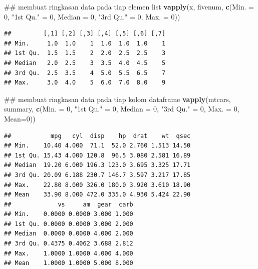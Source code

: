 \documentclass[]{book}
\newenvironment{Shaded}{\begin{snugshade}}{\end{snugshade}}
\newcommand{\KeywordTok}[1]{\textcolor[rgb]{0.13,0.29,0.53}{\textbf{#1}}}
\newcommand{\DataTypeTok}[1]{\textcolor[rgb]{0.13,0.29,0.53}{#1}}
\newcommand{\DecValTok}[1]{\textcolor[rgb]{0.00,0.00,0.81}{#1}}
\newcommand{\StringTok}[1]{\textcolor[rgb]{0.31,0.60,0.02}{#1}}
\newcommand{\NormalTok}[1]{#1}
\begin{document}
\begin{Shaded}
\begin{Highlighting}[]
\NormalTok{## membuat ringkasan data pada tiap elemen list}
\KeywordTok{vapply}\NormalTok{(x, fivenum,}
       \KeywordTok{c}\NormalTok{(}\DataTypeTok{Min. =} \DecValTok{0}\NormalTok{, }\StringTok{"1st Qu."}\NormalTok{ =}\StringTok{ }\DecValTok{0}\NormalTok{, }
         \DataTypeTok{Median =} \DecValTok{0}\NormalTok{, }\StringTok{"3rd Qu."}\NormalTok{ =}\StringTok{ }\DecValTok{0}\NormalTok{, }\DataTypeTok{Max. =} \DecValTok{0}\NormalTok{))}
\end{Highlighting}
\end{Shaded}

\begin{verbatim}
##         [,1] [,2] [,3] [,4] [,5] [,6] [,7]
## Min.     1.0  1.0    1  1.0  1.0  1.0    1
## 1st Qu.  1.5  1.5    2  2.0  2.5  2.5    3
## Median   2.0  2.5    3  3.5  4.0  4.5    5
## 3rd Qu.  2.5  3.5    4  5.0  5.5  6.5    7
## Max.     3.0  4.0    5  6.0  7.0  8.0    9
\end{verbatim}

\begin{Shaded}
\begin{Highlighting}[]
\NormalTok{## membuat ringkasan data pada tiap kolom dataframe}
\KeywordTok{vapply}\NormalTok{(mtcars, summary,}
       \KeywordTok{c}\NormalTok{(}\DataTypeTok{Min. =} \DecValTok{0}\NormalTok{, }\StringTok{"1st Qu."}\NormalTok{ =}\StringTok{ }\DecValTok{0}\NormalTok{, }
         \DataTypeTok{Median =} \DecValTok{0}\NormalTok{, }\StringTok{"3rd Qu."}\NormalTok{ =}\StringTok{ }\DecValTok{0}\NormalTok{, }\DataTypeTok{Max. =} \DecValTok{0}\NormalTok{, }\DataTypeTok{Mean=}\DecValTok{0}\NormalTok{))}
\end{Highlighting}
\end{Shaded}

\begin{verbatim}
##           mpg   cyl  disp    hp  drat    wt  qsec
## Min.    10.40 4.000  71.1  52.0 2.760 1.513 14.50
## 1st Qu. 15.43 4.000 120.8  96.5 3.080 2.581 16.89
## Median  19.20 6.000 196.3 123.0 3.695 3.325 17.71
## 3rd Qu. 20.09 6.188 230.7 146.7 3.597 3.217 17.85
## Max.    22.80 8.000 326.0 180.0 3.920 3.610 18.90
## Mean    33.90 8.000 472.0 335.0 4.930 5.424 22.90
##             vs     am  gear  carb
## Min.    0.0000 0.0000 3.000 1.000
## 1st Qu. 0.0000 0.0000 3.000 2.000
## Median  0.0000 0.0000 4.000 2.000
## 3rd Qu. 0.4375 0.4062 3.688 2.812
## Max.    1.0000 1.0000 4.000 4.000
## Mean    1.0000 1.0000 5.000 8.000
\end{verbatim}
\end{document}
